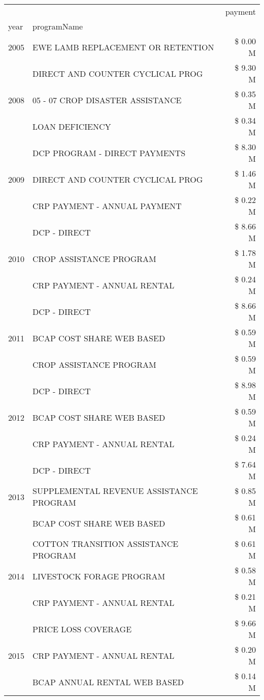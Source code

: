 \begin{tabular}{llr}
\toprule
 &  & payment \\
year & programName &  \\
\midrule
2005 & EWE LAMB REPLACEMENT OR RETENTION & \$ 0.00 M \\
\cline{1-3}
\multirow[t]{3}{*}{2008} & DIRECT AND COUNTER CYCLICAL PROG & \$ 9.30 M \\
 & 05 - 07 CROP DISASTER ASSISTANCE & \$ 0.35 M \\
 & LOAN DEFICIENCY & \$ 0.34 M \\
\cline{1-3}
\multirow[t]{3}{*}{2009} & DCP PROGRAM - DIRECT PAYMENTS & \$ 8.30 M \\
 & DIRECT AND COUNTER CYCLICAL PROG & \$ 1.46 M \\
 & CRP PAYMENT - ANNUAL PAYMENT & \$ 0.22 M \\
\cline{1-3}
\multirow[t]{3}{*}{2010} & DCP - DIRECT & \$ 8.66 M \\
 & CROP ASSISTANCE PROGRAM & \$ 1.78 M \\
 & CRP PAYMENT - ANNUAL RENTAL & \$ 0.24 M \\
\cline{1-3}
\multirow[t]{3}{*}{2011} & DCP - DIRECT & \$ 8.66 M \\
 & BCAP COST SHARE WEB BASED & \$ 0.59 M \\
 & CROP ASSISTANCE PROGRAM & \$ 0.59 M \\
\cline{1-3}
\multirow[t]{3}{*}{2012} & DCP - DIRECT & \$ 8.98 M \\
 & BCAP COST SHARE WEB BASED & \$ 0.59 M \\
 & CRP PAYMENT - ANNUAL RENTAL & \$ 0.24 M \\
\cline{1-3}
\multirow[t]{3}{*}{2013} & DCP - DIRECT & \$ 7.64 M \\
 & SUPPLEMENTAL REVENUE ASSISTANCE PROGRAM & \$ 0.85 M \\
 & BCAP COST SHARE WEB BASED & \$ 0.61 M \\
\cline{1-3}
\multirow[t]{3}{*}{2014} & COTTON TRANSITION ASSISTANCE PROGRAM & \$ 0.61 M \\
 & LIVESTOCK FORAGE PROGRAM & \$ 0.58 M \\
 & CRP PAYMENT - ANNUAL RENTAL & \$ 0.21 M \\
\cline{1-3}
\multirow[t]{3}{*}{2015} & PRICE LOSS COVERAGE & \$ 9.66 M \\
 & CRP PAYMENT - ANNUAL RENTAL & \$ 0.20 M \\
 & BCAP ANNUAL RENTAL WEB BASED & \$ 0.14 M \\
\cline{1-3}

\end{tabular}
